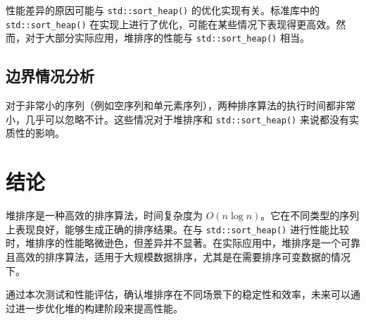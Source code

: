 \documentclass{article}
\begin{document}
性能差异的原因可能与 \texttt{std::sort\_heap()} 的优化实现有关。标准库中的 \texttt{std::sort\_heap()} 在实现上进行了优化，可能在某些情况下表现得更高效。然而，对于大部分实际应用，堆排序的性能与 \texttt{std::sort\_heap()} 相当。

\subsection{边界情况分析}
对于非常小的序列（例如空序列和单元素序列），两种排序算法的执行时间都非常小，几乎可以忽略不计。这些情况对于堆排序和 \texttt{std::sort\_heap()} 来说都没有实质性的影响。

\section{结论}
堆排序是一种高效的排序算法，时间复杂度为 $O(n \log n)$。它在不同类型的序列上表现良好，能够生成正确的排序结果。在与 \texttt{std::sort\_heap()} 进行性能比较时，堆排序的性能略微逊色，但差异并不显著。在实际应用中，堆排序是一个可靠且高效的排序算法，适用于大规模数据排序，尤其是在需要排序可变数据的情况下。

通过本次测试和性能评估，确认堆排序在不同场景下的稳定性和效率，未来可以通过进一步优化堆的构建阶段来提高性能。
\end{document}
